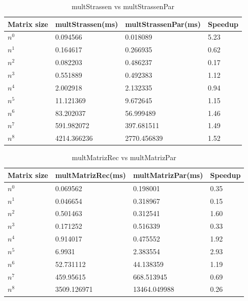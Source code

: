 \documentclass[12pt, a4paper]{article}
\begin{document}
\begin{table}[h]
    \centering
    \begin{tabular}{ | m{2cm} | m{3cm} | m{4cm} | m{3cm} | }
    \hline
    Matrix size & multStrassen(ms) & multStrassenPar(ms) & Speedup \\ 
    \hline
    $n^0$ & 0.094566 & 0.018089 & 5.23 \\
    $n^1$ & 0.164617 & 0.266935 & 0.62 \\
    $n^2$ & 0.082203 & 0.486237 & 0.17 \\
    $n^3$ & 0.551889 & 0.492383 & 1.12 \\
    $n^4$ & 2.002918 & 2.132335 & 0.94 \\
    $n^5$ & 11.121369 & 9.672645 & 1.15 \\
    $n^6$ & 83.202037 & 56.999489 & 1.46 \\
    $n^7$ & 591.982072 & 397.681511 & 1.49 \\
    $n^8$ & 4214.366236 & 2770.456839 & 1.52 \\
    \hline
    \end{tabular}
    \caption{multStrassen vs multStrassenPar}
    \label{table:strassen_comparison}
\end{table}

\begin{table}[h]
    \centering
    \begin{tabular}{ | m{2cm} | m{4cm} | m{4cm} | m{3cm} | }
    \hline
    Matrix size & multMatrizRec(ms) & multMatrizPar(ms) & Speedup \\ 
    \hline
    $n^0$ & 0.069562 & 0.198001 & 0.35 \\
    $n^1$ & 0.046654 & 0.318967 & 0.15 \\
    $n^2$ & 0.501463 & 0.312541 & 1.60 \\
    $n^3$ & 0.171252 & 0.516339 & 0.33 \\
    $n^4$ & 0.914017 & 0.475552 & 1.92 \\
    $n^5$ & 6.9931 & 2.383554 & 2.93 \\
    $n^6$ & 52.731112 & 44.138359 & 1.19 \\
    $n^7$ & 459.95615 & 668.513945 & 0.69 \\
    $n^8$ & 3509.126971 & 13464.049988 & 0.26 \\
    \hline
    \end{tabular}
    \caption{multMatrizRec vs multMatrizPar}
    \label{table:matrix_comparison_rec_par}
\end{table}
\end{document}
